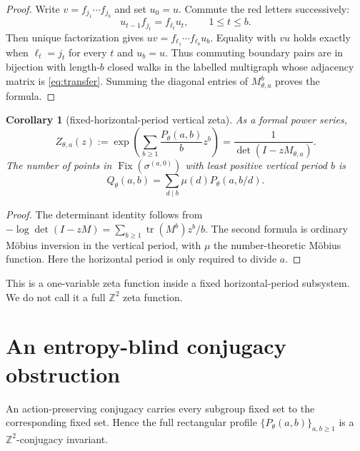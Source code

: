 \documentclass[11pt,a4paper]{amsart}
\newtheorem{corollary}[theorem]{Corollary}
\theoremstyle{definition}
\theoremstyle{remark}
\newcommand{\Z}{\mathbb Z}
\newcommand{\Fix}{\operatorname{Fix}}
\newcommand{\tr}{\operatorname{tr}}
\begin{document}
\begin{proof}
Write $v=f_{j_1}\cdots f_{j_b}$ and set $u_0=u$.  Commute the red letters
successively:
\[
 u_{t-1}f_{j_t}=f_{\ell_t}u_t,
 \qquad 1\leq t\leq b.
\]
Then unique factorization gives
$uv=f_{\ell_1}\cdots f_{\ell_b}u_b$.  Equality with $vu$ holds exactly when
$\ell_t=j_t$ for every $t$ and $u_b=u$.  Thus commuting boundary pairs are
in bijection with length-$b$ closed walks in the labelled multigraph whose
adjacency matrix is \eqref{eq:transfer}.  Summing the diagonal entries of
$M_{\theta,a}^b$ proves the formula.
\end{proof}

\begin{corollary}[fixed-horizontal-period vertical zeta]\label{cor:zeta}
As a formal power series,
\[
 Z_{\theta,a}(z)
 :=\exp\left(\sum_{b\geq1}\frac{P_\theta(a,b)}{b}z^b\right)
 =\frac{1}{\det(I-zM_{\theta,a})}.
\]
The number of points in $\Fix(\sigma^{(a,0)})$ with least positive vertical
period $b$ is
\[
 Q_\theta(a,b)=\sum_{d\mid b}\mu(d)P_\theta(a,b/d).
\]
\end{corollary}

\begin{proof}
The determinant identity follows from
$-\log\det(I-zM)=\sum_{b\geq1}\tr(M^b)z^b/b$.  The second formula is ordinary
Möbius inversion in the vertical period, with $\mu$ the number-theoretic
Möbius function.  Here the horizontal period is only required to divide $a$.
\end{proof}

This is a one-variable zeta function inside a fixed horizontal-period
subsystem.  We do not call it a full $\Z^2$ zeta function.

\section{An entropy-blind conjugacy obstruction}

An action-preserving conjugacy carries every subgroup fixed set to the
corresponding fixed set.  Hence the full rectangular profile
$\{P_\theta(a,b)\}_{a,b\geq1}$ is a $\Z^2$-conjugacy invariant.
\end{document}
